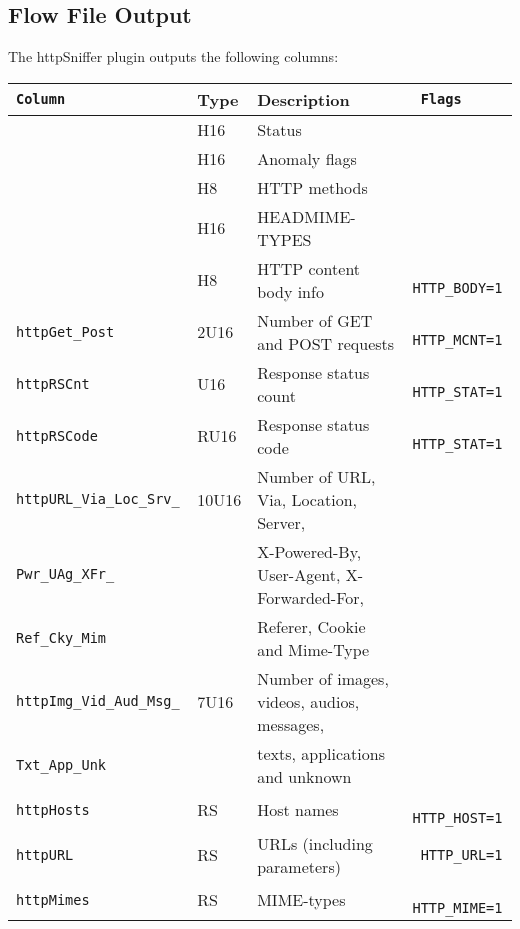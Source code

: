\documentclass[documentation]{subfiles}
\begin{document}
\subsection{Flow File Output}
The httpSniffer plugin outputs the following columns:
\begin{longtable}{>{\tt}lll>{\tt\small}l}
    \toprule
    {\bf Column} & {\bf Type} & {\bf Description} & {\bf Flags}\\
    \midrule\endhead%
    \nameref{httpStat}        & H16   & Status                                            & \\
    \nameref{httpAFlags}      & H16   & Anomaly flags                                     & \\
    \nameref{httpMethods}     & H8    & HTTP methods                                      & \\
    \nameref{httpHeadMimes}   & H16   & HEADMIME-TYPES                                    & \\
    \nameref{httpCFlags}      & H8    & HTTP content body info                            & HTTP\_BODY=1\\
    httpGet\_Post             & 2U16  & Number of GET and POST requests                   & HTTP\_MCNT=1\\
    httpRSCnt                 & U16   & Response status count                             & HTTP\_STAT=1\\
    httpRSCode                & RU16  & Response status code                              & HTTP\_STAT=1\\
    httpURL\_Via\_Loc\_Srv\_  & 10U16 & Number of URL, Via, Location, Server,             & \\
    \qquad Pwr\_UAg\_XFr\_    &       & \qquad X-Powered-By, User-Agent, X-Forwarded-For, & \\
    \qquad Ref\_Cky\_Mim      &       & \qquad Referer, Cookie and Mime-Type              & \\
    httpImg\_Vid\_Aud\_Msg\_  & 7U16  & Number of images, videos, audios, messages,       & \\
    \qquad Txt\_App\_Unk      &       & \qquad texts, applications and unknown            & \\
    httpHosts                 & RS    & Host names                                        & HTTP\_HOST=1\\
    httpURL                   & RS    & URLs (including parameters)                       & HTTP\_URL=1\\
    httpMimes                 & RS    & MIME-types                                        & HTTP\_MIME=1\\

\end{longtable}
\end{document}
